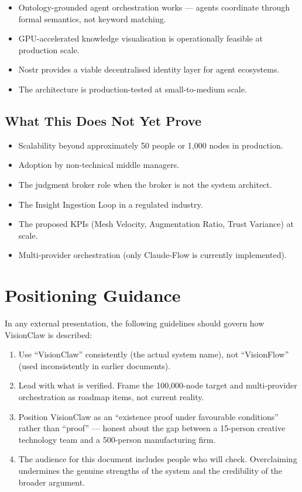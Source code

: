 \begin{itemize}
  \item Ontology-grounded agent orchestration works --- agents coordinate through formal semantics, not keyword matching.
  \item GPU-accelerated knowledge visualisation is operationally feasible at production scale.
  \item Nostr provides a viable decentralised identity layer for agent ecosystems.
  \item The architecture is production-tested at small-to-medium scale.
\end{itemize}

\subsection{What This Does Not Yet Prove}

\begin{itemize}
  \item Scalability beyond approximately 50 people or 1,000 nodes in production.
  \item Adoption by non-technical middle managers.
  \item The judgment broker role when the broker is not the system architect.
  \item The Insight Ingestion Loop in a regulated industry.
  \item The proposed KPIs (Mesh Velocity, Augmentation Ratio, Trust Variance) at scale.
  \item Multi-provider orchestration (only Claude-Flow is currently implemented).
\end{itemize}

\section{Positioning Guidance}

In any external presentation, the following guidelines should govern how VisionClaw is described:

\begin{enumerate}
  \item Use ``VisionClaw'' consistently (the actual system name), not ``VisionFlow'' (used inconsistently in earlier documents).
  \item Lead with what is verified. Frame the 100,000-node target and multi-provider orchestration as roadmap items, not current reality.
  \item Position VisionClaw as an ``existence proof under favourable conditions'' rather than ``proof'' --- honest about the gap between a 15-person creative technology team and a 500-person manufacturing firm.
  \item The audience for this document includes people who will check. Overclaiming undermines the genuine strengths of the system and the credibility of the broader argument.
\end{enumerate}

